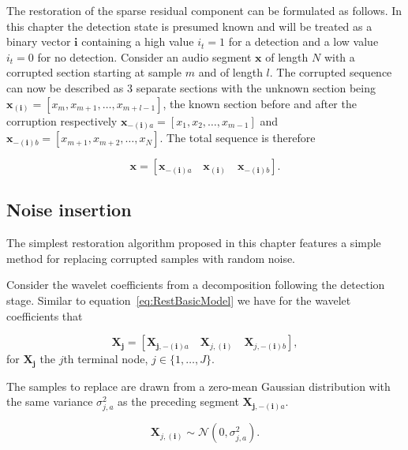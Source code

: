 The restoration of the sparse residual component can be formulated as follows. In this chapter the detection state is presumed known and will be treated as a binary vector $\boldsymbol{i}$ containing a high value $i_t = 1$ for a detection and a low value $i_t = 0$ for no detection. Consider an audio segment $\boldsymbol{x}$ of length $N$ with a corrupted section starting at sample $m$ and of length $l$. The corrupted sequence can now be described as 3 separate sections with the unknown section being $\boldsymbol{x_{(i)}} = [x_m,x_{m+1},\ldots,x_{m+l-1}]$, the known section before and after the corruption respectively $\boldsymbol{x}_{\boldsymbol{-(i)}a} = [x_1,x_{2},\ldots,x_{m-1}]$ and $\boldsymbol{x}_{\boldsymbol{-(i)}b} = [x_{m+1},x_{m+2},\ldots,x_{N}]$. The total sequence is therefore

\begin{equation}\label{eq:RestBasicModel}
\boldsymbol{x} = \left[ \boldsymbol{x}_{\boldsymbol{-(i)}a}\quad\boldsymbol{x_{(i)}}\quad\boldsymbol{x}_{\boldsymbol{-(i)}b} \right].
\end{equation}


\subsection{Noise insertion}
The simplest restoration algorithm proposed in this chapter features a simple method for replacing corrupted samples with random noise.

Consider the wavelet coefficients from a decomposition following the detection stage. Similar to equation~\ref{eq:RestBasicModel} we have for the wavelet coefficients that

\begin{equation}\label{eq:RestBasicModelWavelet1}
\boldsymbol{X_j} = \left[ \boldsymbol{X}_{\boldsymbol{j,-(i)}a}\quad\boldsymbol{X}_{j,\boldsymbol{(i)}}\quad\boldsymbol{X}_{j,\boldsymbol{-(i)}b} \right],
\end{equation}
for $\boldsymbol{X_j}$ the $j$th terminal node, $j \in \{1, \ldots, J\}$.

The samples to replace are drawn from a zero-mean Gaussian distribution with the same variance $\sigma^2_{j,a}$ as the preceding segment $\boldsymbol{X}_{\boldsymbol{j,-(i)}a}$.

\begin{equation}\label{eq:RestNoiseInsertionModelVariance1}
\boldsymbol{X}_{j,\boldsymbol{(i)}} \sim \mathcal{N}\left(0, \sigma^2_{j,a} \right).
\end{equation}

